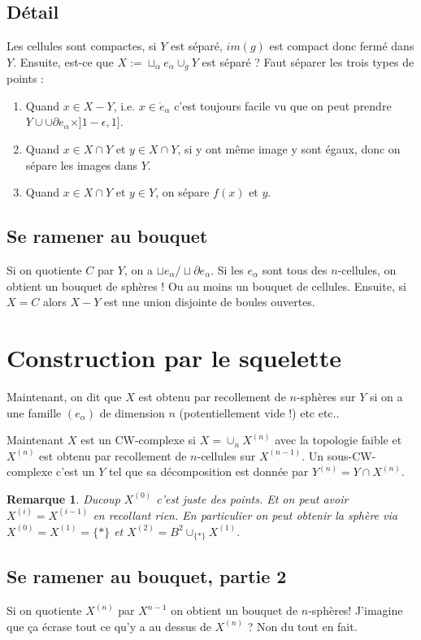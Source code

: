 \documentclass[a4paper,12pt]{book}
\theoremstyle{plain}
\newtheorem{rem}{Remarque}
\theoremstyle{definition}
\theoremstyle{remark}
\begin{document}
\subsection{Détail}
Les cellules sont compactes, si $Y$ est séparé, $im(g)$ est compact
donc fermé dans $Y$. Ensuite, est-ce que 
$X:=\sqcup_\alpha e_\alpha\cup_g Y$ est séparé ? Faut séparer
les trois types de points :
\begin{enumerate}
  \item Quand $x\in X-Y$, i.e. $x\in \mathring e_\alpha$ c'est
    toujours facile vu que on peut prendre
    $Y\cup \cup \partial e_\alpha\times ]1-\epsilon,1]$.
  \item Quand $x\in X\cap Y$ et $y\in X\cap Y$, si y ont même
    image y sont égaux, donc on sépare les images dans $Y$.
  \item Quand $x\in X\cap Y$ et $y\in Y$, on sépare $f(x)$ et $y$.
\end{enumerate}


\subsection{Se ramener au bouquet}
Si on quotiente $C$ par $Y$, on a 
$\sqcup e_\alpha/\sqcup \partial e_\alpha$.
Si les $e_\alpha$ sont tous des $n$-cellules, on obtient un bouquet
de
sphères ! Ou au moins un bouquet de cellules. Ensuite, si $X=C$
alors $X-Y$ est une union disjointe de boules ouvertes.


\section{Construction par le squelette}
Maintenant, on dit que $X$ est obtenu par recollement de 
$n$-sphères sur $Y$ si on a une famille $(e_\alpha)$ de dimension
$n$ (potentiellement vide !) etc etc..

Maintenant $X$ est un CW-complexe si $X=\cup_n X^{(n)}$ avec
la topologie faible et 
$X^{(n)}$ est obtenu par recollement de $n$-cellules sur 
$X^{(n-1)}$. Un sous-CW-complexe c'est un $Y$ tel que sa 
décomposition est donnée par $Y^{(n)}=Y\cap X^{(n)}$.

\begin{rem}
Ducoup $X^{(0)}$ c'est juste des points. Et
on peut avoir $X^{(i)}=X^{(i-1)}$ en recollant rien. En
particulier on peut obtenir la sphère via $X^{(0)}=X^{(1)}=\{*\}$
et $X^{(2)}=B^2\cup_{\{*\}} X^{(1)}$.
\end{rem}

\subsection{Se ramener au bouquet, partie 2}
Si on quotiente $X^{(n)}$ par $X^{n-1}$ on obtient un bouquet
de $n$-sphères! J'imagine que ça écrase tout ce qu'y a au dessus
de $X^{(n)}$ ? Non du tout en fait.
\end{document}
